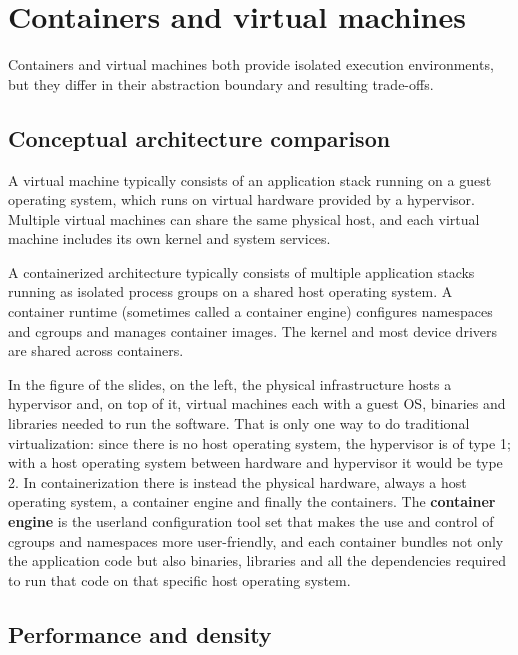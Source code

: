 \section{Containers and virtual machines}

Containers and virtual machines both provide isolated execution environments, but they differ in their abstraction boundary and resulting trade-offs.

\subsection{Conceptual architecture comparison}

A virtual machine typically consists of an application stack running on a guest operating system, which runs on virtual hardware provided by a hypervisor. Multiple virtual machines can share the same physical host, and each virtual machine includes its own kernel and system services.

A containerized architecture typically consists of multiple application stacks running as isolated process groups on a shared host operating system. A container runtime (sometimes called a container engine) configures namespaces and cgroups and manages container images. The kernel and most device drivers are shared across containers.

In the figure of the slides, on the left, the physical infrastructure hosts a hypervisor and, on top of it, virtual machines each with a guest OS, binaries and libraries needed to run the software. That is only one way to do traditional virtualization: since there is no host operating system, the hypervisor is of type 1; with a host operating system between hardware and hypervisor it would be type 2. In containerization there is instead the physical hardware, always a host operating system, a container engine and finally the containers. The \textbf{container engine} is the userland configuration tool set that makes the use and control of cgroups and namespaces more user-friendly, and each container bundles not only the application code but also binaries, libraries and all the dependencies required to run that code on that specific host operating system.

\begin{center}
\end{center}

\subsection{Performance and density}

